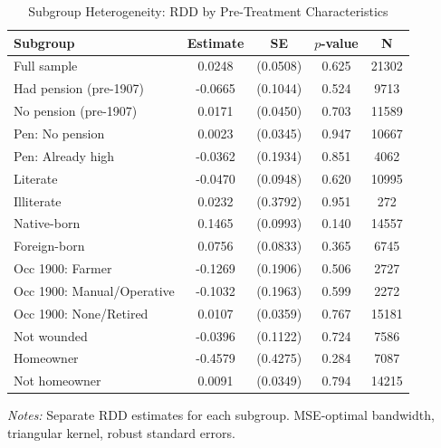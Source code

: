 \begin{table}[htbp]
\centering
\caption{Subgroup Heterogeneity: RDD by Pre-Treatment Characteristics}
\label{tab:subgroups}
\begin{tabular}{lcccc}
\toprule
  Subgroup & Estimate & SE & $p$-value & N \\
\midrule
  Full sample & 0.0248 & (0.0508) & 0.625 & 21302 \\
  Had pension (pre-1907) & -0.0665 & (0.1044) & 0.524 & 9713 \\
  No pension (pre-1907) & 0.0171 & (0.0450) & 0.703 & 11589 \\
  Pen: No pension & 0.0023 & (0.0345) & 0.947 & 10667 \\
  Pen: Already high & -0.0362 & (0.1934) & 0.851 & 4062 \\
  Literate & -0.0470 & (0.0948) & 0.620 & 10995 \\
  Illiterate & 0.0232 & (0.3792) & 0.951 & 272 \\
  Native-born & 0.1465 & (0.0993) & 0.140 & 14557 \\
  Foreign-born & 0.0756 & (0.0833) & 0.365 & 6745 \\
  Occ 1900: Farmer & -0.1269 & (0.1906) & 0.506 & 2727 \\
  Occ 1900: Manual/Operative & -0.1032 & (0.1963) & 0.599 & 2272 \\
  Occ 1900: None/Retired & 0.0107 & (0.0359) & 0.767 & 15181 \\
  Not wounded & -0.0396 & (0.1122) & 0.724 & 7586 \\
  Homeowner & -0.4579 & (0.4275) & 0.284 & 7087 \\
  Not homeowner & 0.0091 & (0.0349) & 0.794 & 14215 \\
\bottomrule
\end{tabular}
\begin{tablenotes}[flushleft]
\small
\item \textit{Notes:} Separate RDD estimates for each subgroup. MSE-optimal bandwidth, triangular kernel, robust standard errors.
\end{tablenotes}
\end{table}
